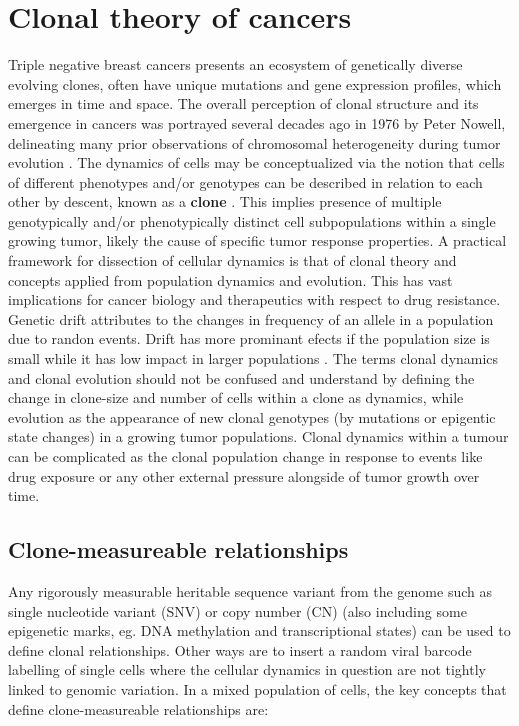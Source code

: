 
\section{Clonal theory of cancers}
Triple negative breast cancers presents an ecosystem of genetically diverse evolving clones, often have unique mutations and gene expression profiles, which emerges in time and space.
The overall perception of clonal structure and its emergence in cancers was portrayed several decades ago in 1976 by Peter Nowell, delineating many prior observations of chromosomal heterogeneity during tumor evolution \cite{nowell1976clonal}. The dynamics of cells may be conceptualized via the notion that cells of different phenotypes and/or genotypes can be described in relation to each other by descent, known as a \textbf{clone} \cite{aparicio2013implications}. This implies presence of multiple genotypically and/or phenotypically distinct cell subpopulations within a single growing tumor, likely the cause of specific tumor response properties.
A practical framework for dissection of cellular dynamics is that of clonal theory and concepts applied from population dynamics and evolution. This has vast implications for cancer biology and therapeutics with respect to drug resistance. Genetic drift attributes to the changes in frequency of an allele in a population due to randon events. Drift has more prominant efects if the population size is small while it has low impact in larger populations \cite{lynch2007origins}.
The terms clonal dynamics and clonal evolution should not be confused and understand by defining the change in clone-size and number of cells within a clone as dynamics, while evolution as the appearance of new clonal genotypes (by mutations or epigentic state changes) in a growing tumor populations. 
 Clonal dynamics within a tumour can be complicated as the clonal population change in response to events like drug exposure or any other external pressure alongside of tumor growth over time.

\subsection{Clone-measureable relationships}
\label{sec:BibTeX}
Any rigorously measurable heritable sequence variant from the genome such as single nucleotide variant (SNV) or copy number (CN) (also including some epigenetic marks, eg. DNA methylation and transcriptional states) can be used to define clonal relationships. Other ways are to insert a random viral barcode labelling of single cells where the cellular dynamics in question are not tightly linked to genomic variation. In a mixed population of cells, the key concepts that define clone-measureable relationships are:

